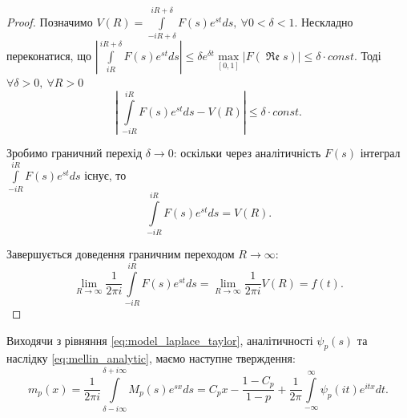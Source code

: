 \begin{corollary}
\begin{proof}
Позначимо $V(R)=\int\limits_{-iR + \delta}^{iR + \delta} F(s) e^{st} ds, ~\forall 0 < \delta < 1$. Нескладно переконатися, що 
$|\int\limits_{iR}^{iR + \delta} F(s) e^{st} ds| \leq \delta e^{\delta t} \max\limits_{[0,1]} |F(\operatorname{\mathfrak{Re}} s)| \leq \delta \cdot const$. Тоді $\forall \delta > 0, ~\forall R > 0$
\begin{equation*}
\left|~\int\limits_{-iR}^{iR} F(s) e^{st} ds - V(R)\right| \leq \delta \cdot const.
\end{equation*}

Зробимо граничний перехід $\delta \rightarrow 0$: оскільки через аналітичність $F(s)$ інтеграл $\int\limits_{-iR}^{iR} F(s) e^{st} ds$ існує, то
\begin{equation*}
\int\limits_{-iR}^{iR} F(s) e^{st} ds = V(R).
\end{equation*}

Завершується доведення граничним переходом $R \rightarrow \infty$:
\begin{equation*}
\lim\limits_{R \rightarrow \infty} \frac{1}{2\pi i} \int\limits_{-iR}^{iR} F(s) e^{st} ds =\lim\limits_{R \rightarrow \infty}\frac{1}{2\pi i} V(R) = f(t).
\end{equation*}
\end{proof}
\end{corollary}

Виходячи з рівняння \eqref{eq:model_laplace_taylor}, аналітичності $\psi_{p} (s)$ та наслідку \eqref{eq:mellin_analytic}, маємо наступне тверждення:
\begin{equation}
m_{p}(x) = \frac{1}{2\pi i} \int\limits_{\delta - i\infty}^{\delta + i\infty} M_{p}(s) e^{sx} ds = C_{p} x - \frac{1 - C_p}{1-p} + \frac{1}{2\pi} \int\limits_{-\infty}^{\infty} \psi_{p}(it) e^{itx} dt.
\end{equation}

